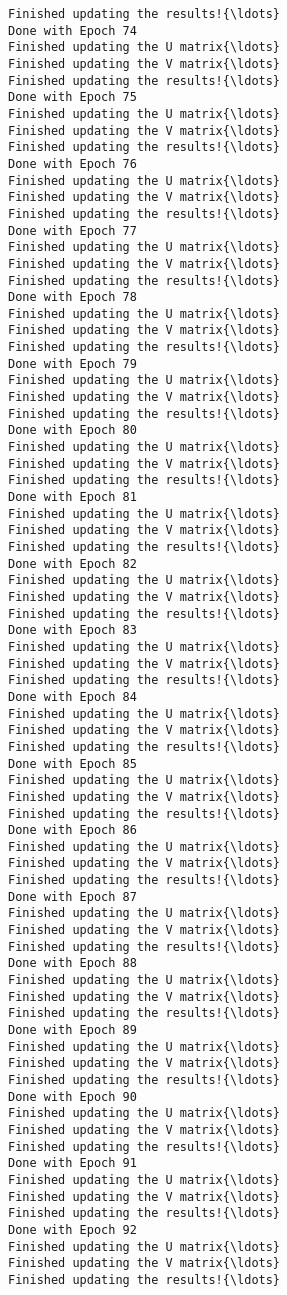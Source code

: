 \documentclass{article}
\begin{document}
\begin{Verbatim}[commandchars=\\\{\}]
Finished updating the results!{\ldots}
Done with Epoch 74
Finished updating the U matrix{\ldots}
Finished updating the V matrix{\ldots}
Finished updating the results!{\ldots}
Done with Epoch 75
Finished updating the U matrix{\ldots}
Finished updating the V matrix{\ldots}
Finished updating the results!{\ldots}
Done with Epoch 76
Finished updating the U matrix{\ldots}
Finished updating the V matrix{\ldots}
Finished updating the results!{\ldots}
Done with Epoch 77
Finished updating the U matrix{\ldots}
Finished updating the V matrix{\ldots}
Finished updating the results!{\ldots}
Done with Epoch 78
Finished updating the U matrix{\ldots}
Finished updating the V matrix{\ldots}
Finished updating the results!{\ldots}
Done with Epoch 79
Finished updating the U matrix{\ldots}
Finished updating the V matrix{\ldots}
Finished updating the results!{\ldots}
Done with Epoch 80
Finished updating the U matrix{\ldots}
Finished updating the V matrix{\ldots}
Finished updating the results!{\ldots}
Done with Epoch 81
Finished updating the U matrix{\ldots}
Finished updating the V matrix{\ldots}
Finished updating the results!{\ldots}
Done with Epoch 82
Finished updating the U matrix{\ldots}
Finished updating the V matrix{\ldots}
Finished updating the results!{\ldots}
Done with Epoch 83
Finished updating the U matrix{\ldots}
Finished updating the V matrix{\ldots}
Finished updating the results!{\ldots}
Done with Epoch 84
Finished updating the U matrix{\ldots}
Finished updating the V matrix{\ldots}
Finished updating the results!{\ldots}
Done with Epoch 85
Finished updating the U matrix{\ldots}
Finished updating the V matrix{\ldots}
Finished updating the results!{\ldots}
Done with Epoch 86
Finished updating the U matrix{\ldots}
Finished updating the V matrix{\ldots}
Finished updating the results!{\ldots}
Done with Epoch 87
Finished updating the U matrix{\ldots}
Finished updating the V matrix{\ldots}
Finished updating the results!{\ldots}
Done with Epoch 88
Finished updating the U matrix{\ldots}
Finished updating the V matrix{\ldots}
Finished updating the results!{\ldots}
Done with Epoch 89
Finished updating the U matrix{\ldots}
Finished updating the V matrix{\ldots}
Finished updating the results!{\ldots}
Done with Epoch 90
Finished updating the U matrix{\ldots}
Finished updating the V matrix{\ldots}
Finished updating the results!{\ldots}
Done with Epoch 91
Finished updating the U matrix{\ldots}
Finished updating the V matrix{\ldots}
Finished updating the results!{\ldots}
Done with Epoch 92
Finished updating the U matrix{\ldots}
Finished updating the V matrix{\ldots}
Finished updating the results!{\ldots}

\end{Verbatim}
\end{document}
